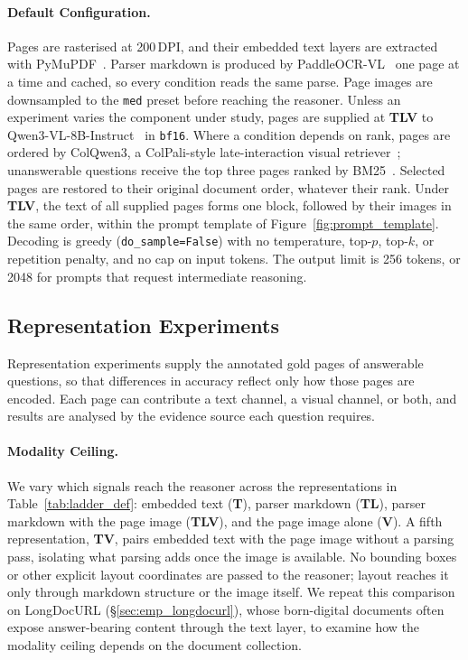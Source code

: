 \paragraph{Default Configuration.} Pages are rasterised at 200\,DPI, and their embedded text layers are extracted with PyMuPDF~\citep{pymupdf}. Parser markdown is produced by PaddleOCR-VL~\citep{cui2025paddleocr} one page at a time and cached, so every condition reads the same parse. Page images are downsampled to the \texttt{med} preset before reaching the reasoner. Unless an experiment varies the component under study, pages are supplied at \textbf{TLV} to Qwen3-VL-8B-Instruct~\citep{team2025qwen3} in \texttt{bf16}. Where a condition depends on rank, pages are ordered by ColQwen3, a ColPali-style late-interaction visual retriever~\citep{faysse2025colpali}; unanswerable questions receive the top three pages ranked by BM25~\citep{robertson2009bm25}. Selected pages are restored to their original document order, whatever their rank. Under \textbf{TLV}, the text of all supplied pages forms one block, followed by their images in the same order, within the prompt template of Figure~\ref{fig:prompt_template}. Decoding is greedy (\texttt{do\_sample=False}) with no temperature, top-$p$, top-$k$, or repetition penalty, and no cap on input tokens. The output limit is 256 tokens, or 2048 for prompts that request intermediate reasoning.

\subsection{Representation Experiments}
\label{sec:emp_representation}

Representation experiments supply the annotated gold pages of answerable questions, so that differences in accuracy reflect only how those pages are encoded. Each page can contribute a text channel, a visual channel, or both, and results are analysed by the evidence source each question requires.



\paragraph{Modality Ceiling.} We vary which signals reach the reasoner across the representations in Table~\ref{tab:ladder_def}: embedded text (\textbf{T}), parser markdown (\textbf{TL}), parser markdown with the page image (\textbf{TLV}), and the page image alone (\textbf{V}). A fifth representation, \textbf{TV}, pairs embedded text with the page image without a parsing pass, isolating what parsing adds once the image is available. No bounding boxes or other explicit layout coordinates are passed to the reasoner; layout reaches it only through markdown structure or the image itself. We repeat this comparison on LongDocURL (\S\ref{sec:emp_longdocurl}), whose born-digital documents often expose answer-bearing content through the text layer, to examine how the modality ceiling depends on the document collection.

